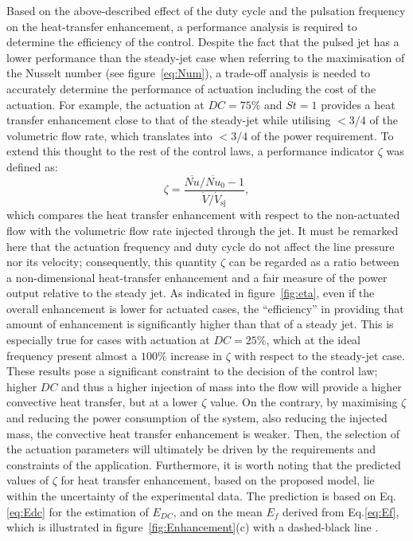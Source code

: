 Based on the above-described effect of the duty cycle and the pulsation frequency on the heat-transfer enhancement, a performance analysis is required to determine the efficiency of the control. Despite the fact that the pulsed jet has a lower performance than the steady-jet case when referring to the maximisation of the Nusselt number (see figure~\ref{eq:Num}), a trade-off analysis is needed to accurately determine the performance of actuation including the cost of the actuation. For example, the actuation at $DC=75\%$ and $St=1$ provides a heat transfer enhancement close to that of the steady-jet while utilising $<3/4$ of the volumetric flow rate, which translates into $<3/4$ of the power requirement. To extend this thought to the rest of the control laws, a performance indicator $\zeta$ was defined as: 
%
\begin{equation}\label{eq:eta}
    \zeta = \frac{ \overline{Nu}/\overline{Nu}_0-1 }{ \dot{V}/\dot{V}_{\mathrm{sj}}},
\end{equation}
%
which compares the heat transfer enhancement with respect to the non-actuated flow with the volumetric flow rate injected through the jet. It must be remarked here that the actuation frequency and duty cycle do not affect the line pressure nor its velocity; consequently, this quantity $\zeta$ can be regarded as a ratio between a non-dimensional heat-transfer enhancement and a fair measure of the power output relative to the steady jet. As indicated in figure~\ref{fig:eta}, even if the overall enhancement is lower for actuated cases, the ``efficiency'' in providing that amount of enhancement is significantly higher than that of a steady jet. This is especially true for cases with actuation at $DC=25\%$, which at the ideal frequency present almost a $100\%$ increase in $\zeta$ with respect to the steady-jet case. These results pose a significant constraint to the decision of the control law; higher $DC$ and thus a higher injection of mass into the flow will provide a higher convective heat transfer, but at a lower $\zeta$ value. On the contrary, by maximising $\zeta$ and reducing the power consumption of the system, also reducing the injected mass, the convective heat transfer enhancement is weaker. Then, the selection of the actuation parameters will ultimately be driven by the requirements and constraints of the application. Furthermore, it is worth noting that the predicted values of $\zeta$ for heat transfer enhancement, based on the proposed model, lie within the uncertainty of the experimental data. The prediction is based on Eq.\eqref{eq:Edc} for the estimation of $E_{DC}$, and on the mean $E_f$ derived from Eq.\eqref{eq:Ef}, which is illustrated in figure~\ref{fig:Enhancement}(c) with a dashed-black line .

